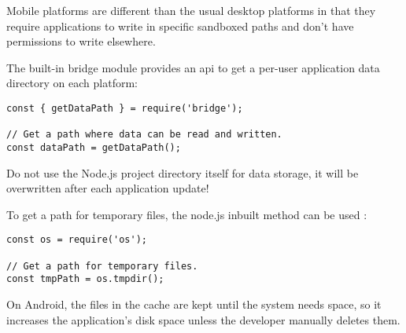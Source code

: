 Mobile platforms are different than the usual desktop platforms in that they require applications to write in specific sandboxed paths and don't have permissions to write elsewhere.
\cite{nodejs-mobile:docs}

The built-in bridge module provides an \ac{api} to get a per-user application data directory on each platform:

\begin{verbatim}
const { getDataPath } = require('bridge');

// Get a path where data can be read and written.
const dataPath = getDataPath();
\end{verbatim}

\begin{warning}[Warning]
  Do not use the Node.js project directory itself for data storage, it will be overwritten after each application update!
  \cite{nodejs-mobile:docs}
\end{warning}

To get a path for temporary files, the node.js inbuilt method  can be used \cite{nodejs}:

\begin{verbatim}
const os = require('os');

// Get a path for temporary files.
const tmpPath = os.tmpdir();
\end{verbatim}

\begin{warning}[Warning]
  On Android, the files in the cache are kept until the system needs space, so it increases the application's disk space unless the developer manually deletes them.
  \cite{nodejs-mobile:docs}
\end{warning}

\printfn
